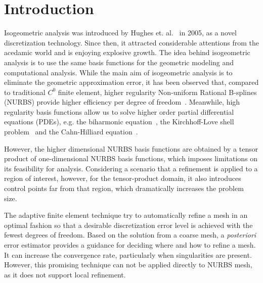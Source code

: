 \documentclass[preprint,12pt]{elsarticle}
\begin{document}
\linenumbers

\section{Introduction}
Isogeometric analysis was introduced by Hughes et. al.~\cite{HUGHES20054135} in 2005, as a novel discretization technology. Since then, it attracted considerable attentions from the acedamic world and is enjoying explosive growth. The idea behind isogeometric analysis is to use the same basis functions for the geometric modeling and computational analysis. While the main aim of isogeometric analysis is to eliminate the geometric approximation error, it has been observed that, compared to traditional $C^0$ finite element, higher regularity Non-uniform Rational B-splines (NURBS) provide higher efficiency per degree of freedom~\cite{bazilevs2006isogeometric, da2011some, da2014mathematical}. Meanwhile, high regularity basis functions allow us to solve higher order partial differential equations (PDEs), e.g. the biharmonic equation~\cite{moore2017discontinuous, kapl_isogeometric_2015, kapl_isogeometric_2017}, the Kirchhoff-Love shell problem~\cite{kiendl2009isogeometric, kiendl2010bending, kiendl2015isogeometric} and the Cahn-Hilliard equation~\cite{gomez2008isogeometric, borden2012phase, borden2014higher}.\par

However, the higher dimensional NURBS basis functions are obtained by a tensor product of one-dimensional NURBS basis functions, which imposes limitations on its feasibility for analysis. Considering a scenario that a refinement is applied to a region of interest, however, for the tensor-product domain, it also introduces control points far from that region, which dramatically increases the problem size. \par

The adaptive finite element technique try to automatically refine a mesh in an optimal fashion so that a desirable discretization error level is achieved with the fewest degrees of freedom. Based on the solution from a coarse mesh, a \textit{posteriori} error estimator provides a guidance for deciding where and how to refine a mesh. It can increase the convergence rate, particularly when singularities are present. However, this promising technique can not be applied directly to NURBS mesh, as it does not support local refinement.\par
\end{document}
